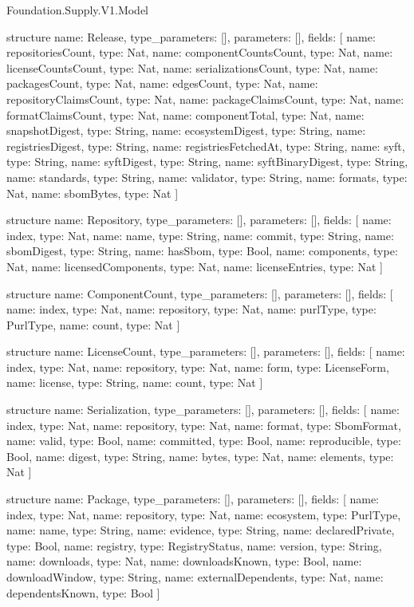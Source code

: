 \begin{lexlean}{Foundation.Supply.V1.Model}
\begin{semanticmodule}
structure{
  name: Release,
  type_parameters: [],
  parameters: [],
  fields: [
    {name: repositoriesCount, type: Nat},
    {name: componentCountsCount, type: Nat},
    {name: licenseCountsCount, type: Nat},
    {name: serializationsCount, type: Nat},
    {name: packagesCount, type: Nat},
    {name: edgesCount, type: Nat},
    {name: repositoryClaimsCount, type: Nat},
    {name: packageClaimsCount, type: Nat},
    {name: formatClaimsCount, type: Nat},
    {name: componentTotal, type: Nat},
    {name: snapshotDigest, type: String},
    {name: ecosystemDigest, type: String},
    {name: registriesDigest, type: String},
    {name: registriesFetchedAt, type: String},
    {name: syft, type: String},
    {name: syftDigest, type: String},
    {name: syftBinaryDigest, type: String},
    {name: standards, type: String},
    {name: validator, type: String},
    {name: formats, type: Nat},
    {name: sbomBytes, type: Nat}
  ]
}

structure{
  name: Repository,
  type_parameters: [],
  parameters: [],
  fields: [
    {name: index, type: Nat},
    {name: name, type: String},
    {name: commit, type: String},
    {name: sbomDigest, type: String},
    {name: hasSbom, type: Bool},
    {name: components, type: Nat},
    {name: licensedComponents, type: Nat},
    {name: licenseEntries, type: Nat}
  ]
}

structure{
  name: ComponentCount,
  type_parameters: [],
  parameters: [],
  fields: [
    {name: index, type: Nat},
    {name: repository, type: Nat},
    {name: purlType, type: PurlType},
    {name: count, type: Nat}
  ]
}

structure{
  name: LicenseCount,
  type_parameters: [],
  parameters: [],
  fields: [
    {name: index, type: Nat},
    {name: repository, type: Nat},
    {name: form, type: LicenseForm},
    {name: license, type: String},
    {name: count, type: Nat}
  ]
}

structure{
  name: Serialization,
  type_parameters: [],
  parameters: [],
  fields: [
    {name: index, type: Nat},
    {name: repository, type: Nat},
    {name: format, type: SbomFormat},
    {name: valid, type: Bool},
    {name: committed, type: Bool},
    {name: reproducible, type: Bool},
    {name: digest, type: String},
    {name: bytes, type: Nat},
    {name: elements, type: Nat}
  ]
}

structure{
  name: Package,
  type_parameters: [],
  parameters: [],
  fields: [
    {name: index, type: Nat},
    {name: repository, type: Nat},
    {name: ecosystem, type: PurlType},
    {name: name, type: String},
    {name: evidence, type: String},
    {name: declaredPrivate, type: Bool},
    {name: registry, type: RegistryStatus},
    {name: version, type: String},
    {name: downloads, type: Nat},
    {name: downloadsKnown, type: Bool},
    {name: downloadWindow, type: String},
    {name: externalDependents, type: Nat},
    {name: dependentsKnown, type: Bool}
  ]
}


\end{semanticmodule}
\end{lexlean}
